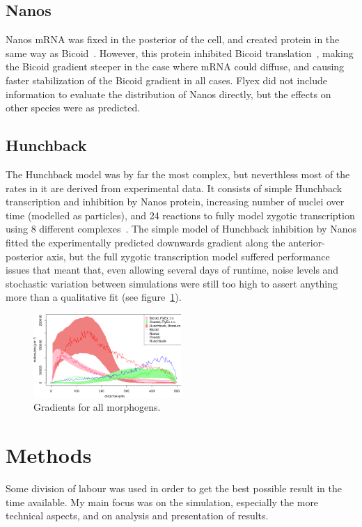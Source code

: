 \documentclass[11pt,a4paper,twocolumn]{article}
\begin{document}
\subsection{Nanos}
Nanos mRNA was fixed in the posterior of the cell, and created protein in the same way as Bicoid~\cite{Kugler2009,Bergmann2007}. However, this protein inhibited Bicoid translation~\cite{Little2011}, making the Bicoid gradient steeper in the case where mRNA could diffuse, and causing faster stabilization of the Bicoid gradient in all cases. Flyex did not include information to evaluate the distribution of Nanos directly, but the effects on other species were as predicted.

\subsection{Hunchback}
The Hunchback model was by far the most complex, but neverthless most of the rates in it are derived from experimental data. It consists of simple Hunchback transcription and inhibition by Nanos protein, increasing number of nuclei over time (modelled as particles), and 24 reactions to fully model zygotic transcription using 8 different complexes~\cite{Holloway2011}. The simple model of Hunchback inhibition by Nanos fitted the experimentally predicted downwards gradient along the anterior-posterior axis, but the full zygotic transcription model suffered performance issues that meant that, even allowing several days of runtime, noise levels and stochastic variation between simulations were still too high to assert anything more than a qualitative fit (see figure~\ref{fig:all}).
\begin{figure}[h]
\includegraphics[width=0.5\textwidth]{writeup-all}
\caption{Gradients for all morphogens. \label{fig:all}}
\end{figure}
\section{Methods}
Some division of labour was used in order to get the best possible result in the time available. My main focus was on the simulation, especially the more technical aspects, and on analysis and presentation of results.
\end{document}

